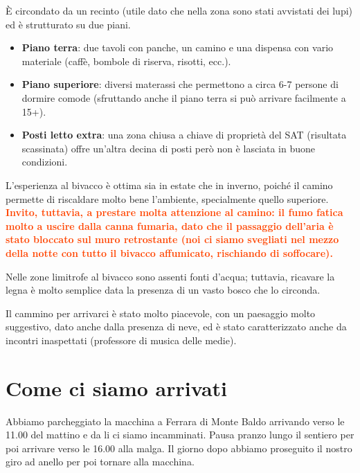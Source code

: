 \documentclass{article}
\begin{document}
È circondato da un recinto (utile dato che nella zona sono stati avvistati dei lupi) ed è strutturato su due piani.
\begin{itemize}
    \item \textbf{Piano terra}: due tavoli con panche, un camino e una dispensa con vario materiale (caffè, bombole di riserva, risotti, ecc.).
    \item \textbf{Piano superiore}: diversi materassi che permettono a circa 6-7 persone di dormire comode (sfruttando anche il piano terra si può arrivare facilmente a 15+).
    \item \textbf{Posti letto extra}: una zona chiusa a chiave di proprietà del SAT (risultata scassinata) offre un'altra decina di posti però non è lasciata in buone condizioni.
\end{itemize}

L'esperienza al bivacco è ottima sia in estate che in inverno, poiché il camino permette di riscaldare molto bene l'ambiente, specialmente quello superiore. \textbf{\textcolor{OrangeRed}{Invito, tuttavia, a prestare molta attenzione al camino: il fumo fatica molto a uscire dalla canna fumaria, dato che il passaggio dell'aria è stato bloccato sul muro retrostante (noi ci siamo svegliati nel mezzo della notte con tutto il bivacco affumicato, rischiando di soffocare).}}

Nelle zone limitrofe al bivacco sono assenti fonti d'acqua; tuttavia, ricavare la legna è molto semplice data la presenza di un vasto bosco che lo circonda.

Il cammino per arrivarci è stato molto piacevole, con un paesaggio molto suggestivo, dato anche dalla presenza di neve, ed è stato caratterizzato anche da incontri inaspettati (professore di musica delle medie).

\section{Come ci siamo arrivati}
Abbiamo parcheggiato la macchina a Ferrara di Monte Baldo arrivando verso le 11.00 del mattino e da li ci siamo incamminati. Pausa pranzo lungo il sentiero per poi arrivare verso le 16.00 alla malga. Il giorno dopo abbiamo proseguito il nostro giro ad anello per poi tornare alla macchina.
\end{document}
